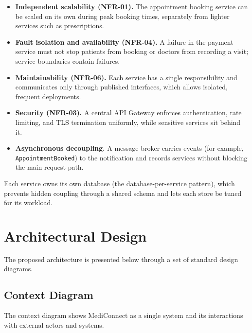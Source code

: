 \documentclass[12pt,a4paper]{article}
\begin{document}
\begin{itemize}[leftmargin=1.4em,itemsep=2pt]
  \item \textbf{Independent scalability (NFR-01).} The appointment booking service can be
        scaled on its own during peak booking times, separately from lighter services such as
        prescriptions.
  \item \textbf{Fault isolation and availability (NFR-04).} A failure in the payment service
        must not stop patients from booking or doctors from recording a visit; service
        boundaries contain failures.
  \item \textbf{Maintainability (NFR-06).} Each service has a single responsibility and
        communicates only through published interfaces, which allows isolated, frequent
        deployments.
  \item \textbf{Security (NFR-03).} A central API Gateway enforces authentication, rate
        limiting, and TLS termination uniformly, while sensitive services sit behind it.
  \item \textbf{Asynchronous decoupling.} A message broker carries events (for example,
        \texttt{AppointmentBooked}) to the notification and records services without blocking
        the main request path.
\end{itemize}

Each service owns its own database (the database-per-service pattern), which prevents hidden
coupling through a shared schema and lets each store be tuned for its workload.

\section{Architectural Design}
The proposed architecture is presented below through a set of standard design diagrams.

\subsection{Context Diagram}
The context diagram shows MediConnect as a single system and its interactions with external
actors and systems.
\end{document}
